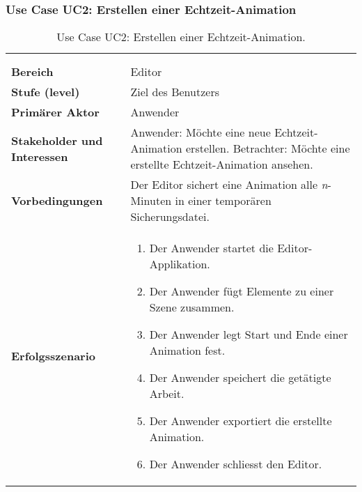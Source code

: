 
\subsubsection{Use Case UC2: Erstellen einer Echtzeit-Animation}
\label{ssubsec:requirements:use-cases:uc2}

\begin{longtabu}{p{0.5\textwidth}p{0.5\textwidth}}
    \centering\\
    \caption{Use Case UC2: Erstellen einer
        Echtzeit-Animation.}\label{table:uc2-create-demo}\\
    \toprule
        \textbf{Bereich} &
        Editor \\
    \cmidrule(r){1-1}\cmidrule(lr){2-2}
        \textbf{Stufe (level)} &
        Ziel des Benutzers \\
    \cmidrule(r){1-1}\cmidrule(lr){2-2}
        \textbf{Primärer Aktor} &
        Anwender \\
    \cmidrule(r){1-1}\cmidrule(lr){2-2}
        \textbf{Stakeholder und Interessen} &
        Anwender: Möchte eine neue Echtzeit-Animation erstellen.\newline
        Betrachter: Möchte eine erstellte Echtzeit-Animation ansehen. \\
    \cmidrule(r){1-1}\cmidrule(lr){2-2}
        \textbf{Vorbedingungen} &
        Der Editor sichert eine Animation alle \textit{n}-Minuten in einer
        temporären Sicherungsdatei. \\
    \cmidrule(r){1-1}\cmidrule(lr){2-2}
        \textbf{Erfolgsszenario} &
        \begin{enumerate}
            \item{Der Anwender startet die Editor-Applikation.}
            \item{Der Anwender fügt Elemente zu einer Szene zusammen.}
            \item{Der Anwender legt Start und Ende einer Animation fest.}
            \item{Der Anwender speichert die getätigte Arbeit.}
            \item{Der Anwender exportiert die erstellte Animation.}
            \item{Der Anwender schliesst den Editor.}
        \end{enumerate} \\

\end{longtabu}
